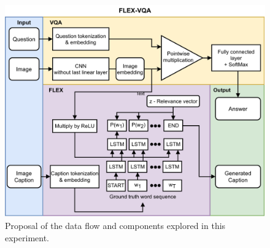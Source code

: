         
        \begin{figure}[htb]
            \centering
            
            \includegraphics[width=\linewidth]{images/flex_architecture_proposal}
            \caption[Proposal of the data flow and components of FLEX-VQA.]{Proposal of the data flow and components explored in this experiment.
            }
            \label{fig:flex_architecture_proposal}
        \end{figure}
                
                
        

        
        
